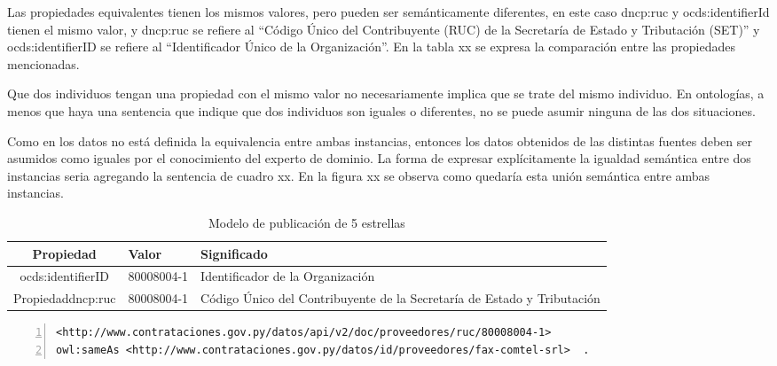  Las propiedades equivalentes tienen los mismos valores, pero pueden ser semánticamente diferentes, en este caso dncp:ruc y ocds:identifierId tienen el mismo valor, y dncp:ruc se refiere al “Código Único del Contribuyente (RUC) de la Secretaría de Estado y Tributación (SET)” y ocds:identifierID se refiere al “Identificador Único de la Organización”. En la tabla xx se expresa la comparación entre las propiedades mencionadas.

 Que dos individuos tengan una propiedad con el mismo valor no necesariamente implica que se trate del mismo individuo. En ontologías, a menos que haya una sentencia que indique que dos individuos son iguales o diferentes, no se puede asumir ninguna de las dos situaciones. 

 Como en los datos no está definida la equivalencia entre ambas instancias, entonces los datos obtenidos de las distintas fuentes deben ser asumidos como iguales por el conocimiento del experto de dominio. La forma de expresar explícitamente la igualdad semántica entre dos instancias seria agregando la sentencia de cuadro xx. En la figura xx se observa como quedaría esta unión semántica entre ambas instancias.
 


 \begin{table}[]
    \centering
    \caption{Modelo de publicación de 5 estrellas}
    \label{modelo-5-estrellas}
    \resizebox{15cm}{!} {
    \begin{tabular}{|c|l|l|}
    \hline
    
Propiedad & Valor &  Significado \\ \hline

ocds:identifierID  & 80008004-1 &  Identificador de la Organización \\ \hline
Propiedaddncp:ruc & 80008004-1 &  Código Único del Contribuyente de la Secretaría de Estado y Tributación \\ \hline

    \end{tabular}
    }
    \end{table}



    \begin{lstlisting}[captionpos=b, caption=Información referente al proceso licitatorio cuyo identificacor es, label=lst:caso-3,  numbers=left,  numberstyle=\tiny\color{mygray},
        basicstyle=\tiny,frame=single]
<http://www.contrataciones.gov.py/datos/api/v2/doc/proveedores/ruc/80008004-1> 
owl:sameAs <http://www.contrataciones.gov.py/datos/id/proveedores/fax-comtel-srl>  .

     \end{lstlisting}

